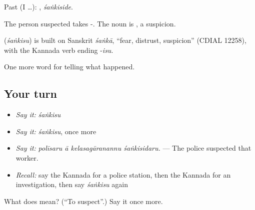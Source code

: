 Past (I …): , \emph{śaṅkiside}.

The person suspected takes -. The noun is , a suspicion.

\begin{cousinweb}
\textbf{} (\emph{śaṅkisu}) is built on Sanskrit \emph{śaṅkā}, \textquotedblleft{}fear, distrust, suspicion\textquotedblright{} (CDIAL 12258), with the Kannada verb ending -\emph{isu}.
\end{cousinweb}

\begin{grammarlens}[title={What you've built}]
One more word for telling what happened.
\end{grammarlens}

\subsection*{Your turn}
\begin{itemize}
\raggedright
  \item \emph{Say it:} \emph{śaṅkisu}
  \item \emph{Say it:} \emph{śaṅkisu}, once more
  \item \emph{Say it:} \emph{polīsaru ā kelasagāranannu śaṅkisidaru.} — The police suspected that worker.
  \item \emph{Recall:} say the Kannada for a police station, then the Kannada for an investigation, then say \emph{śaṅkisu} again
\end{itemize}

\begin{tcolorbox}[breakable,colback=teal!4,colframe=teal!35!black,title={Before you move on}]
What does  mean? (\textquotedblleft{}To suspect\textquotedblright{}.) Say it once more.
\end{tcolorbox}
